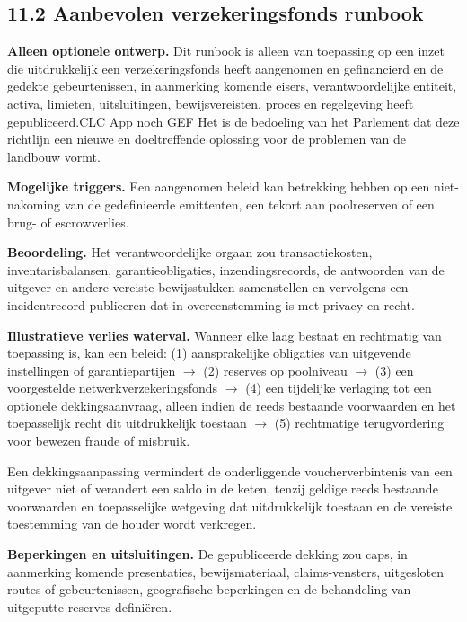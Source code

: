 \documentclass[11pt]{article}
\begin{document}
\subsection*{11.2 Aanbevolen verzekeringsfonds runbook}

\textbf{Alleen optionele ontwerp.} Dit runbook is alleen van toepassing op een inzet die uitdrukkelijk een verzekeringsfonds heeft aangenomen en gefinancierd en de gedekte gebeurtenissen, in aanmerking komende eisers, verantwoordelijke entiteit, activa, limieten, uitsluitingen, bewijsvereisten, proces en regelgeving heeft gepubliceerd.CLC App noch GEF Het is de bedoeling van het Parlement dat deze richtlijn een nieuwe en doeltreffende oplossing voor de problemen van de landbouw vormt.

\textbf{Mogelijke triggers.} Een aangenomen beleid kan betrekking hebben op een niet-nakoming van de gedefinieerde emittenten, een tekort aan poolreserven of een brug- of escrowverlies.

\textbf{Beoordeling.} Het verantwoordelijke orgaan zou transactiekosten, inventarisbalansen, garantieobligaties, inzendingsrecords, de antwoorden van de uitgever en andere vereiste bewijsstukken samenstellen en vervolgens een incidentrecord publiceren dat in overeenstemming is met privacy en recht.

\textbf{Illustratieve verlies waterval.} Wanneer elke laag bestaat en rechtmatig van toepassing is, kan een beleid: (1) aansprakelijke obligaties van uitgevende instellingen of garantiepartijen $\to$ (2) reserves op poolniveau $\to$ (3) een voorgestelde netwerkverzekeringsfonds $\to$ (4) een tijdelijke verlaging tot een optionele dekkingsaanvraag, alleen indien de reeds bestaande voorwaarden en het toepasselijk recht dit uitdrukkelijk toestaan $\to$ (5) rechtmatige terugvordering voor bewezen fraude of misbruik.

Een dekkingsaanpassing vermindert de onderliggende voucherverbintenis van een uitgever niet of verandert een saldo in de keten, tenzij geldige reeds bestaande voorwaarden en toepasselijke wetgeving dat uitdrukkelijk toestaan en de vereiste toestemming van de houder wordt verkregen.

\textbf{Beperkingen en uitsluitingen.} De gepubliceerde dekking zou caps, in aanmerking komende presentaties, bewijsmateriaal, claims-vensters, uitgesloten routes of gebeurtenissen, geografische beperkingen en de behandeling van uitgeputte reserves definiëren.
\end{document}

